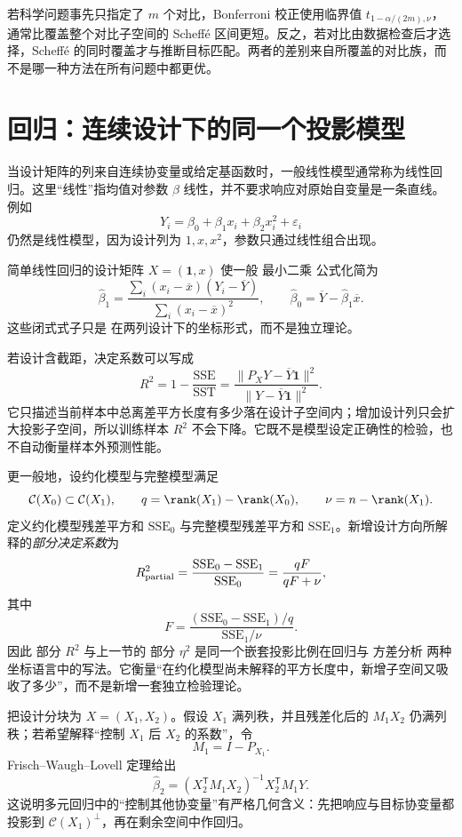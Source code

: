 若科学问题事先只指定了 $m$ 个对比，Bonferroni 校正使用临界值 $t_{1-\alpha/(2m),\nu}$，通常比覆盖整个对比子空间的 Scheffé 区间更短。反之，若对比由数据检查后才选择，Scheffé 的同时覆盖才与推断目标匹配。两者的差别来自所覆盖的对比族，而不是哪一种方法在所有问题中都更优。

\section{回归：连续设计下的同一个投影模型}

当设计矩阵的列来自连续协变量或给定基函数时，一般线性模型通常称为线性回归。这里“线性”指均值对参数 $\beta$ 线性，并不要求响应对原始自变量是一条直线。例如
\[
 Y_i=\beta_0+\beta_1x_i+\beta_2x_i^2+\varepsilon_i
\]
仍然是线性模型，因为设计列为 $1,x,x^2$，参数只通过线性组合出现。

简单线性回归的设计矩阵 $X=(\mathbf1,x)$ 使一般 最小二乘 公式化简为
\[
 \widehat\beta_1
 =\frac{\sum_i(x_i-\overline x)(Y_i-\overline Y)}
 {\sum_i(x_i-\overline x)^2},
 \qquad
 \widehat\beta_0
 =\overline Y-\widehat\beta_1\overline x.
\]
这些闭式式子只是 在两列设计下的坐标形式，而不是独立理论。

若设计含截距，决定系数可以写成
\[
 R^2
 =1-\frac{\mathrm{SSE}}{\mathrm{SST}}
 =\frac{\|P_XY-\overline Y\mathbf1\|^2}
 {\|Y-\overline Y\mathbf1\|^2}.
\]
它只描述当前样本中总离差平方长度有多少落在设计子空间内；增加设计列只会扩大投影子空间，所以训练样本 $R^2$ 不会下降。它既不是模型设定正确性的检验，也不自动衡量样本外预测性能。

更一般地，设约化模型与完整模型满足
\[
 \mathcal C(X_0)\subset\mathcal C(X_1),
 \qquad
 q=\rank(X_1)-\rank(X_0),
 \qquad
 \nu=n-\rank(X_1).
\]
定义约化模型残差平方和 $\mathrm{SSE}_0$ 与完整模型残差平方和 $\mathrm{SSE}_1$。新增设计方向所解释的\emph{部分决定系数}为
\begin{equation*}R^2_{\rm partial}
 =\frac{\mathrm{SSE}_0-\mathrm{SSE}_1}{\mathrm{SSE}_0}
 =\frac{qF}{qF+\nu},
\end{equation*}
其中
\[
 F
 =\frac{(\mathrm{SSE}_0-\mathrm{SSE}_1)/q}{\mathrm{SSE}_1/\nu}.
\]
因此 部分 $R^2$ 与上一节的 部分 $\eta^2$ 是同一个嵌套投影比例在回归与 方差分析 两种坐标语言中的写法。它衡量“在约化模型尚未解释的平方长度中，新增子空间又吸收了多少”，而不是新增一套独立检验理论。

\begin{theorem}
\label{thm:math-linear-fwl}
把设计分块为 $X=(X_1,X_2)$。假设 $X_1$ 满列秩，并且残差化后的 $M_1X_2$ 仍满列秩；若希望解释“控制 $X_1$ 后 $X_2$ 的系数”，令
\[
 M_1=I-P_{X_1}.
\]
Frisch--Waugh--Lovell 定理给出
\begin{equation}\label{eq:math-stat-fwl}
 \widehat\beta_2
 =(X_2^{\mathsf T}M_1X_2)^{-1}
 X_2^{\mathsf T}M_1Y.
\end{equation}
这说明多元回归中的“控制其他协变量”有严格几何含义：先把响应与目标协变量都投影到 $\mathcal C(X_1)^\perp$，再在剩余空间中作回归。
\end{theorem}



